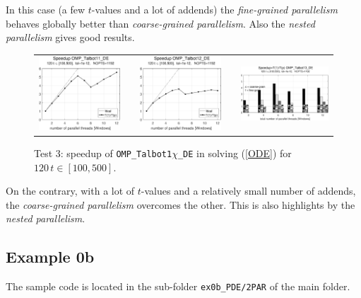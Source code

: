 \documentclass[a4paper,10pt]{report}%
\begin{document}
\noindent In this case (a few $t$-values and a lot of addends) the {\em fine-grained parallelism} behaves globally better than {\em coarse-grained parallelism}. Also the {\em nested parallelism} gives good results.
\begin{figure}[htb]
\centering
\begin{tabular}{ccccc}
\includegraphics[height=0.2\textwidth]{./FIGS/EX0a/EX0a_test3_speedup_11_Windows.eps} &&
\includegraphics[height=0.2\textwidth]{./FIGS/EX0a/EX0a_test3_speedup_12_Windows.eps} &&
\includegraphics[height=0.2\textwidth,keepaspectratio=true]{./FIGS/EX0a/EX0a_test3_speedup_13_Windows.eps}
\end{tabular}
\caption{\small Test 3: speedup of {\tt OMP\_Talbot1$\chi$\_DE} in solving (\ref{ODE}) for $120\,t\in[100,500]$.}
\label{PAR_EX0a_speedup_test3}
\end{figure}

\noindent On the contrary, with a lot of $t$-values and a relatively small number of addends, the {\em coarse-grained parallelism} overcomes the other. This is also highlights by the {\em nested parallelism}.



\subsection{Example 0b}
The sample code is located in the sub-folder {\tt ex0b\_PDE/2PAR} of the main folder.
\end{document}

